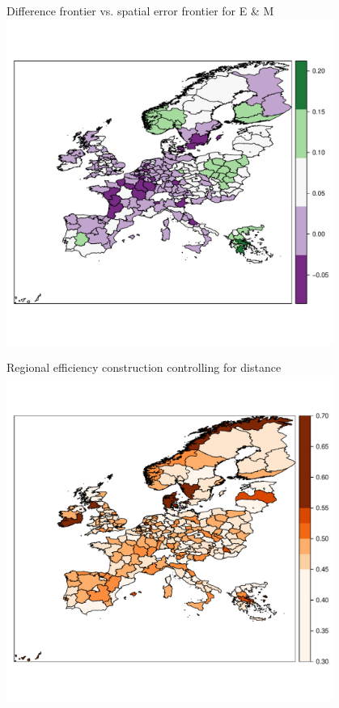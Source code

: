 \documentclass[ignorenonframetext]{beamer}
\begin{document}
\begin{frame}{Difference frontier vs. spatial error frontier for E \& M}
\includegraphics[width=0.8\textwidth]{TEfrontierdiff}
\end{frame}

\begin{frame}{Regional efficiency construction controlling for distance}
\includegraphics[width=0.8\textwidth]{TEfrontierCon}
\end{frame}
\end{document}
